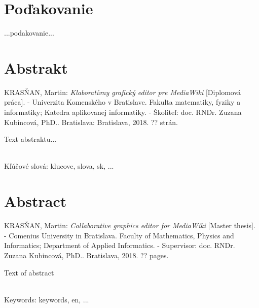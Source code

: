 \documentclass[12pt, a4paper, oneside]{book}
\newcommand\mftitle{Klaboratívny grafický editor pre MediaWiki}
\newcommand\enmftitle{Collaborative graphics editor for MediaWiki}
\newcommand\mfthesistype{Diplomová práca}
\newcommand\enmfthesistype{Master thesis}
\newcommand\mfadvisor{doc. RNDr. Zuzana Kubincová, PhD.}
\newcommand\mfplacedate{Bratislava, 2018}
\newcommand\mfpracovisko{Katedra aplikovanej informatiky}
\newcommand\enmfpracovisko{Department of Applied Informatics}
\begin{document}
\chapter*{Poďakovanie}\label{chap:thank_you}
...podakovanie...
\vfill\eject 

\chapter*{Abstrakt}\label{chap:abstract_sk}
\MakeUppercase{Krasňan}, Martin: \textit{\mftitle} [\mfthesistype]. - Univerzita Komenského v Bratislave. Fakulta matematiky, fyziky a informatiky; \mfpracovisko. - Školiteľ: \mfadvisor. Bratislava: \mfplacedate. ?? strán.

Text abstraktu...

~\\
Kľúčové slová: klucove, slova, sk, ...
\vfill\eject 

\chapter*{Abstract}\label{chap:abstract_en}
\MakeUppercase{Krasňan}, Martin: \textit{\enmftitle} [\enmfthesistype]. - Comenius University in Bratislava. Faculty of Mathematics, Physics and Informatics; \enmfpracovisko. - Supervisor: \mfadvisor. \mfplacedate. ?? pages.

Text of abstract

~\\
Keywords: keywords, en, ...
\vfill\eject 



\tableofcontents

\def\spaceafterpar{1em}
\setlength{\parskip}{\spaceafterpar}
\setlength\parindent{0pt}

\mainmatter









\backmatter
\def\spaceafterpar{0em}
\setlength{\parskip}{\spaceafterpar}
\listoffigures

\listoftables



\nocite{*}


\end{document}
